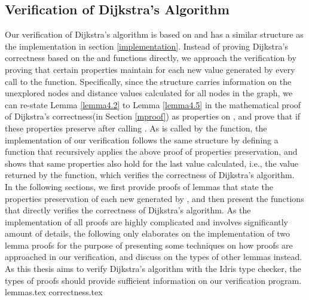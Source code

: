 \subsection{Verification of Dijkstra's Algorithm} \label{verification}
Our verification of Dijkstra's algorithm is based on and has a similar structure as the implementation in section \ref{implementation}. Instead of proving Dijkstra's correctness based on the  and  functions directly, we approach the verification by proving that certain properties maintain for each new  value generated by every call to the  function. Specifically, since the  structure carries information on the unexplored nodes and distance values calculated for all nodes in the graph, we can re-state Lemma \ref{lemma4.2} to Lemma \ref{lemma4.5} in the mathematical proof of Dijkstra's correctness(in Section \ref{mproof}) as properties on , and prove that if these properties preserve after calling . As  is called by the  function, the implementation of our verification follows the same structure by defining a function that recursively applies the above proof of properties preservation, and shows that same properties also hold for the last  value calculated, i.e., the value returned by the  function, which verifies the correctness of Dijkstra's algorithm. 
\\

In the following sections, we first provide proofs of lemmas that state the properties preservation of each new  generated by , and then present the functions that directly verifies the correctness of Dijkstra's algorithm. As the implementation of all proofs are highly complicated and involves significantly amount of details, the following only elaborates on the implementation of two lemma proofs for the purpose of presenting some techniques on how proofs are approached in our verification, and discuss on the types of other lemmas instead. As this thesis aims to verify Dijkstra's algorithm with the Idris type checker, the types of proofs should provide sufficient information on our verification program.
\\

{lemmas.tex}
{correctness.tex}


